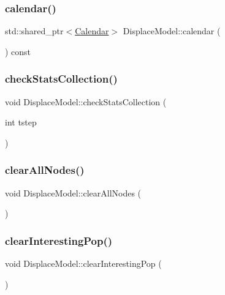 \subsubsection{\texorpdfstring{calendar()}{calendar()}}
{\footnotesize\ttfamily std\+::shared\+\_\+ptr$<$\mbox{\hyperlink{class_calendar}{Calendar}}$>$ Displace\+Model\+::calendar (\begin{DoxyParamCaption}{ }\end{DoxyParamCaption}) const\hspace{0.3cm}{\ttfamily [inline]}}

\mbox{\label{class_displace_model_addc9042dfab7c97629b36cabc06efa77}} 
\subsubsection{\texorpdfstring{checkStatsCollection()}{checkStatsCollection()}}
{\footnotesize\ttfamily void Displace\+Model\+::check\+Stats\+Collection (\begin{DoxyParamCaption}\item[{int}]{tstep }\end{DoxyParamCaption})\hspace{0.3cm}{\ttfamily [protected]}}

\mbox{\label{class_displace_model_a467c933c35e6a439e50756f7db39829a}} 
\subsubsection{\texorpdfstring{clearAllNodes()}{clearAllNodes()}}
{\footnotesize\ttfamily void Displace\+Model\+::clear\+All\+Nodes (\begin{DoxyParamCaption}{ }\end{DoxyParamCaption})}

\mbox{\label{class_displace_model_a9c20536494a366da712fe77dce1b45ce}} 
\subsubsection{\texorpdfstring{clearInterestingPop()}{clearInterestingPop()}}
{\footnotesize\ttfamily void Displace\+Model\+::clear\+Interesting\+Pop (\begin{DoxyParamCaption}{ }\end{DoxyParamCaption})}

